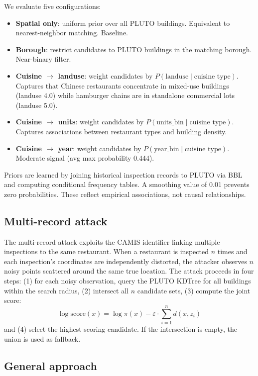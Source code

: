 \documentclass[11pt]{article}
\begin{document}
We evaluate five configurations:
\begin{itemize}[leftmargin=1.5em]
    \item \textbf{Spatial only}: uniform prior over all PLUTO buildings. Equivalent to nearest-neighbor matching. Baseline.
    \item \textbf{Borough}: restrict candidates to PLUTO buildings in the matching borough. Near-binary filter.
    \item \textbf{Cuisine $\to$ landuse}: weight candidates by $P(\text{landuse} \mid \text{cuisine type})$. Captures that Chinese restaurants concentrate in mixed-use buildings (landuse 4.0) while hamburger chains are in standalone commercial lots (landuse 5.0).
    \item \textbf{Cuisine $\to$ units}: weight candidates by $P(\text{units\_bin} \mid \text{cuisine type})$. Captures associations between restaurant types and building density.
    \item \textbf{Cuisine $\to$ year}: weight candidates by $P(\text{year\_bin} \mid \text{cuisine type})$. Moderate signal (avg max probability 0.444).
\end{itemize}

Priors are learned by joining historical inspection records to PLUTO via BBL and computing conditional frequency tables. A smoothing value of 0.01 prevents zero probabilities. These reflect empirical associations, not causal relationships.

\subsection{Multi-record attack}

The multi-record attack exploits the CAMIS identifier linking multiple inspections to the same restaurant. When a restaurant is inspected $n$ times and each inspection's coordinates are independently distorted, the attacker observes $n$ noisy points scattered around the same true location. The attack proceeds in four steps: (1) for each noisy observation, query the PLUTO KDTree for all buildings within the search radius, (2) intersect all $n$ candidate sets, (3) compute the joint score:
\begin{equation}
\log\text{score}(x) = \log \pi(x) - \varepsilon \cdot \sum_{i=1}^{n} d(x, z_i)
\end{equation}
and (4) select the highest-scoring candidate. If the intersection is empty, the union is used as fallback.

\subsection{General approach}
\end{document}
